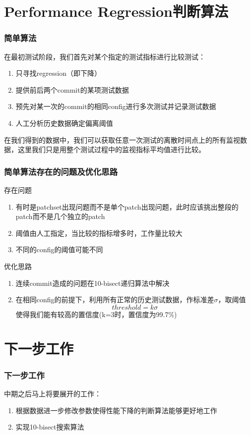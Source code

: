\documentclass[xcolor=dvipsnames,11pt]{beamer}
\begin{document}
\section{Performance Regression判断算法}

\begin{frame}
\frametitle{简单算法}
在最初测试阶段，我们首先对某个指定的测试指标进行比较测试：
\begin{enumerate}
\item 只寻找regression（即下降）
\item 提供前后两个commit的某项测试数据
\item 预先对某一次的commit的相同config进行多次测试并记录测试数据
\item 人工分析历史数据确定偏离阈值
\end{enumerate}

在我们得到的数据中，我们可以获取任意一次测试的离散时间点上的所有监视数据，这里我们只是用整个测试过程中的监视指标平均值进行比较。

\end{frame}

\begin{frame}
\frametitle{简单算法存在的问题及优化思路}
\begin{block}{存在问题}
\begin{enumerate}
\item 有时是patchset出现问题而不是单个patch出现问题，此时应该挑出整段的patch而不是几个独立的patch
\item 阈值由人工指定，当比较的指标增多时，工作量比较大
\item 不同的config的阈值可能不同
\end{enumerate}
\end{block}
\begin{block}{优化思路}
\begin{enumerate}
\item 连续commit造成的问题在10-bisect递归算法中解决
\item 在相同config的前提下，利用所有正常的历史测试数据，作标准差$\sigma$，取阈值
$$threshold = k \sigma$$
使得我们能有较高的置信度(k=3时，置信度为99.7\%)
\end{enumerate}
\end{block}
\end{frame}


\section{下一步工作}

\begin{frame}
\frametitle{下一步工作}
中期之后马上将要展开的工作：
\begin{enumerate}
\item 根据数据进一步修改参数使得性能下降的判断算法能够更好地工作
\item 实现10-bisect搜索算法
\end{enumerate}

\end{frame}


\end{document}
